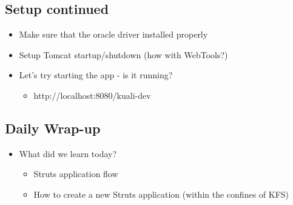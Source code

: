 \documentclass[12pt,notitlepage]{article}
\begin{document}
    \W \begin{s5slide}
        \W \section{Setup continued}
        \begin{ifhtml}
            \begin{itemize}
                \item Make sure that the oracle driver installed properly
                \item Setup Tomcat startup/shutdown (how with WebTools?)
                \item Let's try starting the app - is it running?
                \begin{itemize}
                    \item http://localhost:8080/kuali-dev
                \end{itemize}
            \end{itemize}
        \end{ifhtml} 
    \W \end{s5slide}
    \W \begin{s5slide}
        \W \section{Daily Wrap-up}
        \begin{ifhtml}
            \begin{itemize}
                \item What did we learn today?
                \begin{itemize}
                    \item Struts application flow
                    \item How to create a new Struts application (within the confines of KFS)
                \end{itemize}
            \end{itemize}
        \end{ifhtml} 
    \W \end{s5slide}
\end{document}
